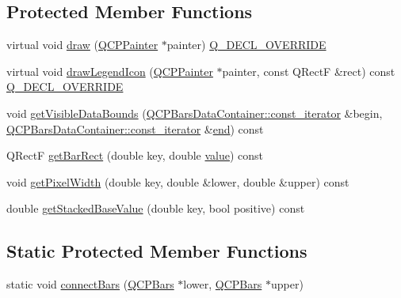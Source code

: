 \subsection*{Protected Member Functions}
\begin{DoxyCompactItemize}
\item 
virtual void \mbox{\hyperlink{class_q_c_p_bars_aa267c20650d55084c3f47cb2f8fac9dc}{draw}} (\mbox{\hyperlink{class_q_c_p_painter}{Q\+C\+P\+Painter}} $\ast$painter) \mbox{\hyperlink{qcustomplot_8h_a42cc5eaeb25b85f8b52d2a4b94c56f55}{Q\+\_\+\+D\+E\+C\+L\+\_\+\+O\+V\+E\+R\+R\+I\+DE}}
\item 
virtual void \mbox{\hyperlink{class_q_c_p_bars_aee7c3e1763fd6b504c45baa8775be7b7}{draw\+Legend\+Icon}} (\mbox{\hyperlink{class_q_c_p_painter}{Q\+C\+P\+Painter}} $\ast$painter, const Q\+RectF \&rect) const \mbox{\hyperlink{qcustomplot_8h_a42cc5eaeb25b85f8b52d2a4b94c56f55}{Q\+\_\+\+D\+E\+C\+L\+\_\+\+O\+V\+E\+R\+R\+I\+DE}}
\item 
void \mbox{\hyperlink{class_q_c_p_bars_ac8b6b514a665a7bff4fb080413ba996a}{get\+Visible\+Data\+Bounds}} (\mbox{\hyperlink{class_q_c_p_data_container_ae40a91f5cb0bcac61d727427449b7d15}{Q\+C\+P\+Bars\+Data\+Container\+::const\+\_\+iterator}} \&begin, \mbox{\hyperlink{class_q_c_p_data_container_ae40a91f5cb0bcac61d727427449b7d15}{Q\+C\+P\+Bars\+Data\+Container\+::const\+\_\+iterator}} \&\mbox{\hyperlink{myutils_8h_a64d77caddefed4b96fa62e3f5f73c9a2}{end}}) const
\item 
Q\+RectF \mbox{\hyperlink{class_q_c_p_bars_a01b87e38e5d5089d214646d2af7896ea}{get\+Bar\+Rect}} (double key, double \mbox{\hyperlink{diffusion_8cpp_a4b41795815d9f3d03abfc739e666d5da}{value}}) const
\item 
void \mbox{\hyperlink{class_q_c_p_bars_ad87586cc5e9806740bc0e867667da409}{get\+Pixel\+Width}} (double key, double \&lower, double \&upper) const
\item 
double \mbox{\hyperlink{class_q_c_p_bars_a0ffd6e043876e13e89eaa54e9f8a04b9}{get\+Stacked\+Base\+Value}} (double key, bool positive) const
\end{DoxyCompactItemize}
\subsection*{Static Protected Member Functions}
\begin{DoxyCompactItemize}
\item 
static void \mbox{\hyperlink{class_q_c_p_bars_a6ea37802cd22f97235cab614b14b9f19}{connect\+Bars}} (\mbox{\hyperlink{class_q_c_p_bars}{Q\+C\+P\+Bars}} $\ast$lower, \mbox{\hyperlink{class_q_c_p_bars}{Q\+C\+P\+Bars}} $\ast$upper)
\end{DoxyCompactItemize}
